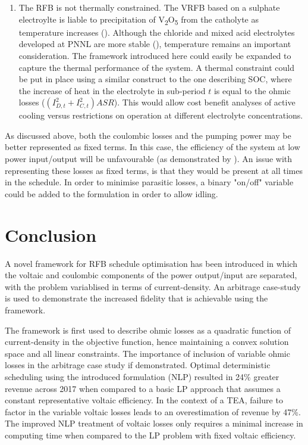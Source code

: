 \documentclass[preprint,3p,review,authoryear,10pt]{elsarticle}
\begin{document}
\begin{enumerate}
    \item The RFB is not thermally constrained. The VRFB based on a sulphate electroylte is liable to precipitation of  V\textsubscript{2}O\textsubscript{5} from the catholyte as temperature increases (\cite{Rahman2009,Vijayakumar2011}). Although the chloride and mixed acid electrolytes developed at PNNL are more stable (\cite{Li2011,Kim2011}), temperature remains an important consideration. The framework introduced here could easily be expanded to capture the thermal performance of the system. A thermal constraint could be put in place using a similar construct to the one describing SOC, where the increase of heat in the electrolyte in sub-period $t$ is equal to the ohmic losses ($(I_{D,t}^{2} + I_{C,t}^{2})ASR$). This would allow cost benefit analyses of active cooling versus restrictions on operation at different electrolyte concentrations.

    
\end{enumerate}

As discussed above, both the coulombic losses and the pumping power may be better represented as fixed terms. In this case, the efficiency of the system at low power input/output will be unfavourable (as demonstrated by \cite{Nguyen2014}). An issue with representing these losses as fixed terms, is that they would be present at all times in the schedule. In order to minimise parasitic losses, a binary "on/off" variable could be added to the formulation in order to allow idling.

\section{Conclusion} 
\label{sec:Conclusion}
A novel framework for RFB schedule optimisation has been introduced in which the voltaic and coulombic components of the power output/input are separated, with the problem variablised in terms of current-density. An arbitrage case-study is used to demonstrate the increased fidelity that is achievable using the framework.

The framework is first used to describe ohmic losses as a quadratic function of current-density in the objective function, hence maintaining a convex solution space and all linear constraints. The importance of inclusion of variable ohmic losses in the arbitrage case study if demonstrated. Optimal deterministic scheduling using the introduced formulation (NLP) resulted in 24\% greater revenue across 2017 when compared to a basic LP approach that assumes a constant representative voltaic efficiency. In the context of a TEA, failure to factor in the variable voltaic losses leads to an overestimation of revenue by 47\%. The improved NLP treatment of voltaic losses only requires a minimal increase in computing time when compared to the LP problem with fixed voltaic efficiency. 
\end{document}
